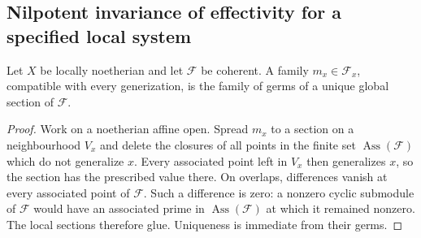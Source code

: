 \subsection{Nilpotent invariance of effectivity for a specified local system}

\begin{lemma}
\label{lem:C-RD9-coherent}
Let $X$ be locally noetherian and let $\mathcal F$ be coherent.
A family $m_x\in\mathcal F_x$, compatible with every generization,
is the family of germs of a unique global section of $\mathcal F$.
\end{lemma}
\begin{proof}
Work on a noetherian affine open. Spread $m_x$ to a section on a
neighbourhood $V_x$ and delete the closures of all points in the finite
set $\operatorname{Ass}(\mathcal F)$ which do not generalize $x$.
Every associated point left in $V_x$ then generalizes $x$, so the
section has the prescribed value there. On overlaps, differences
vanish at every associated point of $\mathcal F$. Such a difference
is zero: a nonzero cyclic submodule of $\mathcal F$ would have an
associated prime in $\operatorname{Ass}(\mathcal F)$ at which it
remained nonzero. The local sections therefore glue. Uniqueness is
immediate from their germs.
\end{proof}

